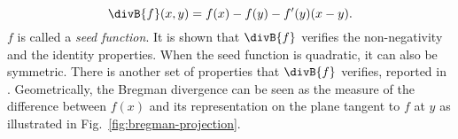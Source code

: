 \iflatexml\else {} \fi
\begin{equation}
\divB{f}(x,y) = f(x)-f(y)-f'(y)(x-y).
\label{eq:bregman-div}
\end{equation} 
$f$ is called a \emph{seed function}.
It is shown that $\divB{f}$ verifies the non-negativity and the identity properties. When the seed function is quadratic, it can also be symmetric. 
There is another set of properties that $\divB{f}$ verifies, reported in \cite{bregman_relaxation_1967}.
Geometrically, the Bregman divergence can be seen as the measure of the difference between $f(x)$ and its representation on the plane tangent to $f$ at $y$ as illustrated in Fig.~\ref{fig:bregman-projection}.
